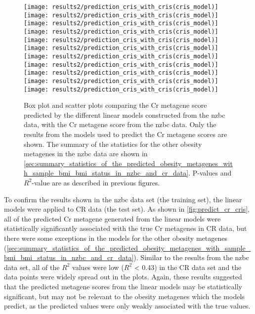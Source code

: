 \begin{figure}[htpb]
	\centering
	\texttt{[image: results2/prediction\_cris\_with\_cris(cris\_model)]}
	\texttt{[image: results2/prediction\_cris\_with\_cris(cris\_model)]}
	\texttt{[image: results2/prediction\_cris\_with\_cris(cris\_model)]}
	\texttt{[image: results2/prediction\_cris\_with\_cris(cris\_model)]}
	\texttt{[image: results2/prediction\_cris\_with\_cris(cris\_model)]}
	\texttt{[image: results2/prediction\_cris\_with\_cris(cris\_model)]}
	\texttt{[image: results2/prediction\_cris\_with\_cris(cris\_model)]}
	\texttt{[image: results2/prediction\_cris\_with\_cris(cris\_model)]}
	\texttt{[image: results2/prediction\_cris\_with\_cris(cris\_model)]}
	\texttt{[image: results2/prediction\_cris\_with\_cris(cris\_model)]}
	\texttt{[image: results2/prediction\_cris\_with\_cris(cris\_model)]}
	\caption[Comparison of the predicted Cr metagene scores with the Cr metagene score from the \gls{nzbc} data]{ Box plot and scatter plots comparing the Cr metagene score predicted by the different linear models constructed from the \gls{nzbc} data, with the Cr metagene score from the \gls{nzbc} data.
	Only the results from the models used to predict the Cr metagene scores are shown.
	The summary of the statistics for the other obesity metagenes in the \gls{nzbc} data are shown in \cref{sec:summary_statistics_of_the_predicted_obesity_metagenes_with_sample_bmi_bmi_status_in_nzbc_and_cr_data}.
	P-values and $R^2$-value are as described in previous figures.
	}
	\label{fig:predict_cris_cris}
\end{figure}

To confirm the results shown in the \gls{nzbc} data set (the training set), the linear models were applied to CR data (the test set).
As shown in \cref{fig:predict_cr_cris}, all of the predicted Cr metagene generated from the linear models were statistically significantly associated with the true Cr metagenes in CR data, but there were some exceptions in the models for the other obesity metagenes (\cref{sec:summary_statistics_of_the_predicted_obesity_metagenes_with_sample_bmi_bmi_status_in_nzbc_and_cr_data}).
Similar to the results from the \gls{nzbc} data set, all of the $R^2$ values were low ($R^2$ \textless{} 0.43) in the CR data set and the data points were widely spread out in the plots.
Again, these results suggested that the predicted metagene scores from the linear models may be statistically significant, but may not be relevant to the obesity metagenes which the models predict, as the predicted values were only weakly associated with the true values.

